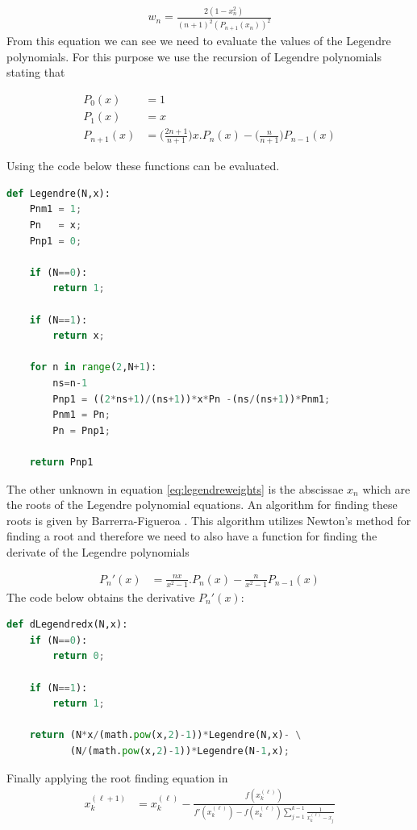 \documentclass[11pt,letterpaper,titlepage]{article}
\newcommand{\beqn}{\begin{equation}
	\begin{aligned}}
\newcommand{\eeqn}{\end{aligned}
	\end{equation}}
\numberwithin{equation}{section}
\begin{document}
\begin{appendices}
\beqn\label{eq:legendreweights}
w_n = \frac{2(1-x_n^2)}{(n+1)^2  (P_{n+1}(x_n))^2}
\eeqn
\newline
From this equation we can see we need to evaluate the values of the Legendre polynomials. For this purpose we use the recursion of Legendre polynomials stating that

\beqn
P_0(x)&=1 \\
P_1(x)&=x\\
P_{n+1}(x) &= \biggr(\frac{2n+1}{n+1}\biggr)x. P_n(x) -\biggr(\frac{n}{n+1}\biggr) P_{n-1}(x)
\eeqn

Using the code below these functions can be evaluated.

\begin{lstlisting}[language=python]
def Legendre(N,x):
    Pnm1 = 1;
    Pn   = x;
    Pnp1 = 0;
    
    if (N==0):
        return 1;
    
    if (N==1):
        return x;
    
    for n in range(2,N+1):
        ns=n-1
        Pnp1 = ((2*ns+1)/(ns+1))*x*Pn -(ns/(ns+1))*Pnm1;
        Pnm1 = Pn;
        Pn = Pnp1;
        
    return Pnp1 
\end{lstlisting}

The other unknown in equation \ref{eq:legendreweights} is the abscissae $x_n$ which are the roots of the Legendre polynomial equations. An algorithm for finding these roots is given by Barrerra-Figueroa \cite{roots}. This algorithm utilizes Newton's method for finding a root and therefore we need to also have a function for finding the derivate of the Legendre polynomials

\beqn
P_{n}'(x) &= \frac{nx}{x^2-1}. P_n(x) - \frac{n}{x^2-1}P_{n-1}(x)
\eeqn
\newline
The code below obtains the derivative $P_n'(x)$:
\begin{lstlisting}[language=python]
def dLegendredx(N,x):
    if (N==0):
        return 0;
    
    if (N==1):
        return 1;
    
    return (N*x/(math.pow(x,2)-1))*Legendre(N,x)- \
           (N/(math.pow(x,2)-1))*Legendre(N-1,x);
\end{lstlisting}

Finally applying the root finding equation in \cite{roots}
\beqn
x_k^{(\ell+1)} &=x_k^{(\ell)} - \frac{f(x_k^{(\ell)})}{f'(x_k^{(\ell)}) - f(x_k^{(\ell)}) \sum_{j=1}^{k-1} \frac{1}{x_k^{(\ell)} - x_j  }   }
\eeqn


\end{appendices}
\end{document}
